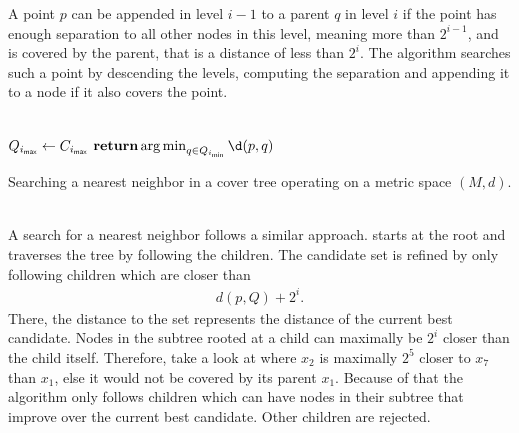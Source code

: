 	A point $p$ can be appended in level $i - 1$ to a parent $q$ in level $i$ if the point has enough separation to all other
	nodes in this level, meaning more than $2^{i - 1}$, and is covered by the parent, that is a distance of less than $2^i$.
	The algorithm searches such a point by descending the levels, computing the separation and appending it to a
	node if it also covers the point.\\\\
	\IncMargin{1em}
	\begin{algorithm}
		\BlankLine
		\BlankLine
		$Q_{i_{\textsf{max}}} \leftarrow C_{i_{\textsf{max}}}$\;
		$\Return \argmin_{q \in Q_{i_{\vmin}}} \d(p, q)$\;
		\BlankLine
		\caption{Searching a nearest neighbor in a cover tree operating on a metric space $(M, d)$.}\label{coverTreeSearch}
	\end{algorithm}\DecMargin{1em}\quad\\
	A search for a nearest neighbor follows a similar approach.  starts at the root and traverses
	the tree by following the children. The candidate set is refined by only following children which are closer than
	\begin{align*}
		d(p, Q) + 2^i.
	\end{align*}
	There, the distance to the set represents the distance of the current best candidate. Nodes in the subtree
	rooted at a child can maximally be $2^i$ closer than the child itself. Therefore, take a look
	at  where $x_2$ is maximally $2^5$ closer to $x_7$ than $x_1$, else it would not
	be covered by its parent $x_1$.
	Because of that the algorithm only follows children which can have nodes in their subtree
	that improve over the current best candidate. Other children are rejected.
	
